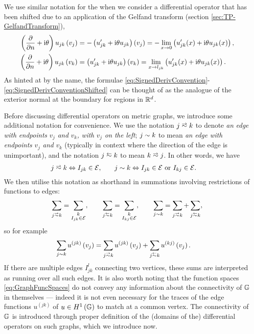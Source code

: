 We use similar notation for the when we consider a differential operator that has been shifted due to an application of the Gelfand transform (section \ref{sec:TP-GelfandTransform}),
\begin{subequations} \label{eq:SignedDerivConventionShifted}
	\begin{align*}
		\left( \dfrac{\partial }{\partial n}+ \mathrm{i}\theta \right)u_{jk}\left( v_j \right) &= -\left( u_{jk}' + \mathrm{i}\theta u_{jk} \right)\left( v_j \right) = -\lim_{x\rightarrow0} \left(  u_{jk}'(x)+\mathrm{i}\theta u_{jk}(x)  \right), \\
		\left( \dfrac{\partial }{\partial n}+ \mathrm{i}\theta \right)u_{jk}\left( v_k \right) &= \left( u_{jk}' + \mathrm{i}\theta u_{jk} \right)\left( v_k \right) = \lim_{x\rightarrow l_{jk}} \left(  u_{jk}'(x)+\mathrm{i}\theta u_{jk}(x)  \right).
	\end{align*}
\end{subequations}
As hinted at by the name, the formulae \eqref{eq:SignedDerivConvention}-\eqref{eq:SignedDerivConventionShifted} can be thought of as the analogue of the exterior normal at the boundary for regions in $\mathbb{R}^d$.

Before discussing differential operators on metric graphs, we introduce some additional notation for convenience.
We use the notation $j\conLeft k$ to denote \emph{an edge with endpoints $v_j$ and $v_k$, with $v_j$ on the left}; $j\sim k$ to mean \emph{an edge with endpoints $v_j$ and $v_k$} (typically in context where the direction of the edge is unimportant), and the notation $j \conRight k$ to mean $k\conLeft j$.
In other words, we have
\begin{align*}
	j\conLeft k \Leftrightarrow I_{jk}\in \edgeSet, &\qquad
	j\con k \Leftrightarrow I_{jk}\in \edgeSet \text{ or } I_{kj}\in \edgeSet.
\end{align*}
We then utilise this notation as shorthand in summations involving restrictions of functions to edges:
\begin{align*}
	\sum_{j\conLeft k} = \sum_{\substack{k \\ I_{jk}\in \edgeSet}}, 
	\qquad 	\sum_{j\conRight k} = \sum_{\substack{k \\ I_{kj}\in \edgeSet}},
	\qquad \sum_{j\con k} = \sum_{j\conLeft k} + \sum_{j\conRight k},
\end{align*}
so for example
\begin{align*}
	\sum_{j\con k}u^{(jk)}\bracs{v_j} &= \sum_{j\conLeft k}u^{(jk)}\bracs{v_j} + \sum_{j\conRight k}u^{(kj)}\bracs{v_j}.
\end{align*}
If there are multiple edges $I_{jk}^l$ connecting two vertices, these sums are interpreted as running over all such edges.
It is also worth noting that the function spaces \eqref{eq:GraphFuncSpaces} do not convey any information about the connectivity of $\mathbb{G}$ in themselves --- indeed it is not even necessary for the traces of the edge functions $u^{(jk)}$ of $u\in H^1\left( \mathbb{G} \right)$ to match at a common vertex. 
The connectivity of $\mathbb{G}$ is introduced through proper definition of the (domains of the) differential operators on such graphs, which we introduce now.


